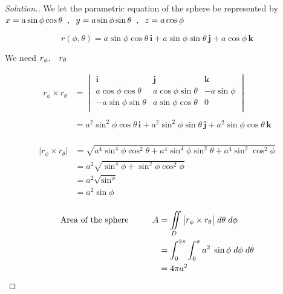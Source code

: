 \documentclass[11pt,a4paper]{article}
\theoremstyle{definition}
\newenvironment{solution}
  {\renewcommand{\qedsymbol}{}\begin{proof}[\textit{Solution}.]}
  {\end{proof}}
\begin{document}
\begin{solution}


We let the parametric equation of the sphere be represented by $x = a\sin \phi \cos \theta \hspace{0.2cm}, \hspace{0.2cm} y  = a\sin \phi \sin \theta \hspace{0.2cm} ,\\ \hspace{0.2cm} z = a\cos \phi$

$$r(\phi, \theta) = a \sin \phi \cos \theta \,\textbf{i} + a \sin \phi \sin \theta \,\textbf{j} + a \cos \phi \,\textbf{k}$$

We need $r_{\phi}, \hspace{0.3cm} r_{\theta}$

\begin{align*}
r_{\phi} \times r_{\theta} & = \begin{vmatrix}
\textbf{i} & \textbf{j} & \textbf{k}\\
a\cos \phi \cos \theta & a \cos \phi \sin \theta & -a \sin \phi\\
-a\sin \phi \sin \theta & a \sin \phi \cos \theta & 0\\
\end{vmatrix}\\\\
& = a^2\sin^2\phi \cos \theta \,\textbf{i} + a^2 \sin^2\phi \sin \theta \,\textbf{j} + a^2 \sin \phi \cos \theta \,\textbf{k}\\
\end{align*}

\begin{align*}
\big|r_{\phi} \times r_{\theta}\big| & = \sqrt{a^4\sin^4\phi \cos^2 \theta + a^4 \sin^4\phi \sin^2\theta + a^4 \sin^2 \cos^2\phi}\\
& = a^2\sqrt{\sin^4 \phi + \sin^2\phi \cos^2 \phi}\\
& = a^2 \sqrt{\sin^ \phi}\\
& = a^2 \sin \phi\\
\end{align*}

\begin{align*}
\text{Area of the sphere}\hspace{1cm}
  A & = \iint\limits_D \big| r_{\phi} \times r_{\theta}\big|\hspace{0.1cm}d\theta \hspace{0.1cm} d\phi\\
& = \int^{2\pi}_0 \int^{\pi}_0 a^2\hspace{0.1cm}\sin\phi \hspace{0.1cm} d\phi \hspace{0.1cm} d\theta\\
& = 4\pi a^2\\
\end{align*}


\end{solution}
\end{document}
